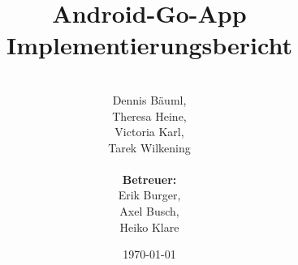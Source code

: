 \documentclass[parskip=full]{scrartcl}
\begin{document}
\title{Android-Go-App Implementierungsbericht}
\author{\\Dennis Bäuml,\\Theresa Heine,\\ Victoria Karl, \\ Tarek Wilkening\\
	\\ \textbf{Betreuer:} \\Erik Burger, \\Axel Busch, \\Heiko Klare \\}

\date{\today}
\maketitle
\newpage
\tableofcontents
\newpage


\newpage
\end{document}
